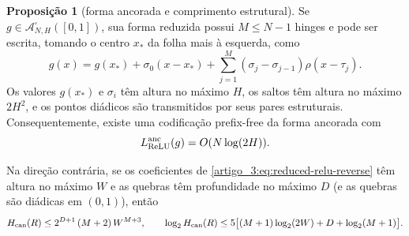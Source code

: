 \documentclass[12pt,a4paper]{article}
\theoremstyle{preciso}
\theoremstyle{definition}
\newcommand{\Aclass}{\mathcal{A}}
\theoremstyle{preciso}
\theoremstyle{preciso}
\theoremstyle{preciso}
\newtheorem{proposition}[teorema]{Proposição}
\theoremstyle{preciso}
\theoremstyle{definition}
\theoremstyle{preciso}
\theoremstyle{definition}
\theoremstyle{preciso}
\theoremstyle{preciso}
\theoremstyle{definition}
\begin{document}
\begin{proposition}[forma ancorada e comprimento estrutural]\label{map:artigo_3:5.4}
\label{artigo_3:prop:anchored-relu-code}
Se $g\in\Aclass^\square_{N,H}([0,1])$, sua forma reduzida possui
$M\le N-1$ hinges e pode ser escrita, tomando o centro $x_*$ da folha mais à
esquerda, como
\begin{equation}
 g(x)=g(x_*)+\sigma_0(x-x_*)
      +\sum_{j=1}^{M}(\sigma_j-\sigma_{j-1})\rho(x-\tau_j).
 \label{artigo_3:eq:anchored-relu-form}
\end{equation}
Os valores $g(x_*)$ e $\sigma_i$ têm altura no máximo $H$, os saltos têm
altura no máximo $2H^2$, e os pontos diádicos são transmitidos por seus pares
estruturais. Consequentemente, existe uma codificação prefix-free da forma
ancorada com
\begin{equation}
 L_{\rm ReLU}^{\rm anc}(g)=O(N\log(2H)).
 \label{artigo_3:eq:anchored-network-bits}
\end{equation}

Na direção contrária, se os coeficientes de
\eqref{artigo_3:eq:reduced-relu-reverse} têm altura no máximo $W$ e as quebras têm
profundidade no máximo $D$ (e as quebras são diádicas em $(0,1)$), então
\begin{equation}
 H_{\rm can}(R)\le 2^{D+1}\,(M+2)\,W^{M+3},
 \qquad
 \log_2 H_{\rm can}(R)
 \le 5\bigl[(M+1)\log_2(2W)+D+\log_2(M+1)\bigr].
 \label{artigo_3:eq:reverse-height-bit-bound}
\end{equation}
\end{proposition}
\end{document}
